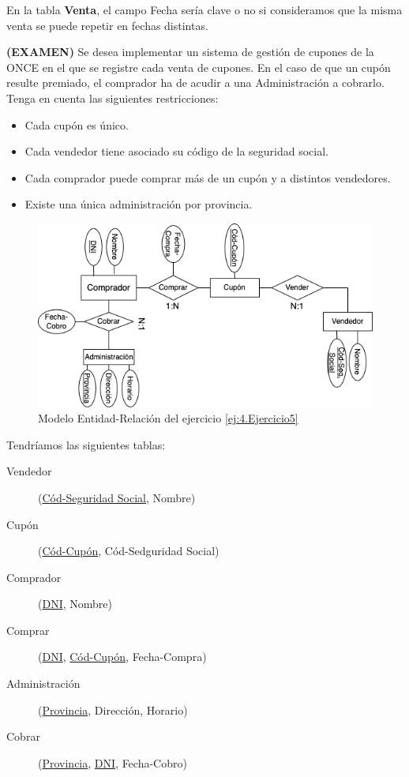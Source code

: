 \begin{ejercicio}
    \begin{observacion}
        En la tabla \textbf{Venta}, el campo Fecha sería clave o no si consideramos que la misma venta se puede repetir en fechas distintas.
    \end{observacion}
\end{ejercicio}


\newpage
\begin{ejercicio}\label{ej:4.Ejercicio5} \textbf{(EXAMEN)}
    Se desea implementar un sistema de gestión de cupones de la ONCE en el que se registre cada venta de cupones. En el caso de que un cupón resulte premiado, el comprador ha de acudir a una Administración a cobrarlo. Tenga en cuenta las siguientes restricciones:
    \begin{itemize}
        \item Cada cupón es único.
        \item Cada vendedor tiene asociado su código de la seguridad social.
        \item Cada comprador puede comprar más de un cupón y a distintos vendedores.
        \item Existe una única administración por provincia.
    \end{itemize}

    \begin{figure}[H]
        \centering
        \includegraphics[width=0.8\linewidth]{Imagenes/Ejercicio 5.png}
        \caption{Modelo Entidad-Relación del ejercicio \ref{ej:4.Ejercicio5}}
        \label{fig:Ej5}
    \end{figure}

    Tendríamos las siguientes tablas:
    \begin{description}
        \item [Vendedor] (\underline{Cód-Seguridad Social}, Nombre)
        \item [Cupón] (\underline{Cód-Cupón}, Cód-Sedguridad Social)
        \item [Comprador] (\underline{DNI}, Nombre)
        \item [Comprar] (\underline{DNI}, \underline{Cód-Cupón}, Fecha-Compra)
        \item [Administración] (\underline{Provincia}, Dirección, Horario)
        \item [Cobrar] (\underline{Provincia}, \underline{DNI}, Fecha-Cobro)       
    \end{description}


\end{ejercicio}




